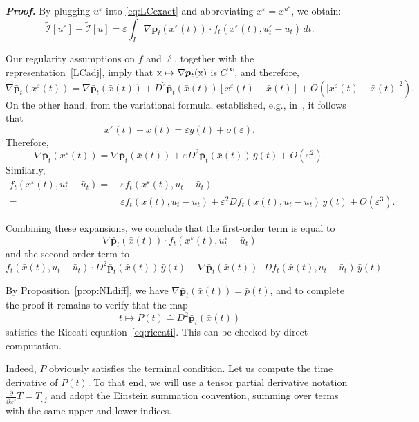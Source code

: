 \documentclass[sn-mathphys-num]{sn-jnl}
\numberwithin{equation}{section}
\theoremstyle{mythm}
\theoremstyle{mydef}
\renewenvironment{proof}{\smallskip\noindent\emph{\textbf{Proof.}}%
  \hspace{1pt}}{\hspace{-5pt}{\nobreak\quad\nobreak\hfill\nobreak%
    $\square$\vspace{2pt}\par}\smallskip\goodbreak}
\renewcommand{\epsilon}{\varepsilon}
\renewcommand{\d}{\,d}
\begin{document}
\begin{proof}
  By plugging \( u^{\varepsilon} \) into \eqref{eq:LCexact} and abbreviating \( x^{\varepsilon} = x^{u^{\varepsilon}} \), we obtain:
  \[
   \widetilde{\mathcal I}[u^{\varepsilon}] - \widetilde{\mathcal I}[\bar{u}]
   = \epsilon\int_I \nabla \bar{\bm p}_t(x^{\varepsilon}(t))\cdot f_t\left(x^{\varepsilon}(t), u^{\varepsilon}_t - \bar{u}_t\right) \d t.
 \]

Our regularity assumptions on \( f \) and \( \ell \), together with the representation~\eqref{LCadj}, imply that \( \mathrm x \mapsto \nabla \bm p_t(\rm x) \) is $C^\infty$, and therefore,
  \[
    \nabla \bar{\bm p}_t(x^{\varepsilon}(t)) = \nabla \bar{\bm p}_t(\bar{x}(t)) + D^2 \bar{\bm p}_t(\bar{x}(t)) \left[x^{\varepsilon}(t) - \bar{x}(t)\right] + O \left( \left|x^{\varepsilon}(t) - \bar{x}(t) \right|^2 \right).
  \]
  On the other hand, from the variational formula, established, e.g., in~\cite[Section~2.7]{agrachevControlTheoryGeometric2004}, it follows that \[
  x^{\varepsilon}(t) - \bar{x}(t) = \varepsilon \bar{y}(t) + o(\varepsilon).
  \]
  Therefore,
  \[
    \nabla \bar{\bm p}_t(x^{\varepsilon}(t)) = \nabla\bar{\bm p}_t(\bar{x}(t)) + \varepsilon D^2 \bar{\bm p}_t(\bar{x}(t)) \, \bar{y}(t) + O(\varepsilon^2).
  \]
  Similarly, 
  \begin{align*}
    f_t(x^{\varepsilon}(t), u^{\varepsilon}_t - \bar{u}_t) = & \
    \varepsilon f_t(x^{\varepsilon}(t), u_t - \bar{u}_t)\\ = & \ 
    \varepsilon f_t(\bar{x}(t), u_t - \bar{u}_t) + \varepsilon^2 Df_t(\bar{x}(t), u_t - \bar{u}_t) \, \bar{y}(t) + O(\varepsilon^3).
  \end{align*}

Combining these expansions, we conclude that the first-order term is equal to
  \[
    \nabla \bar{\bm p}_t(\bar{x}(t)) \cdot f_t(x^{\varepsilon}(t), u^{\varepsilon}_t - \bar{u}_t)
  \]
  and the second-order term to
  \[
    f_t(\bar{x}(t), u_t - \bar{u}_t) \cdot D^2 \bar{\bm p}_t(\bar{x}(t)) \, \bar{y}(t) + \nabla \bar{\bm p}_t(\bar{x}(t)) \cdot Df_t(\bar{x}(t), u_t - \bar{u}_t) \, \bar{y}(t).
  \]

  By Proposition~\ref{prop:NLdiff}, we have \( \nabla \bar{\bm p}_t(\bar{x}(t)) = \bar{p}(t) \), and to complete the proof it remains to verify that the map
  \[
    t \mapsto P(t) \doteq D^2 \bar{\bm p}_t(\bar{x}(t))
  \]
  satisfies the Riccati equation~\eqref{eq:riccati}. This can be checked by direct computation.

Indeed, \( P \) obviously satisfies the terminal condition. Let us compute the time derivative of \( P(t) \).
To that end, we will use a tensor partial derivative notation \( \frac{\partial}{\partial x^{j}} T = T_{,j} \) and adopt the Einstein summation convention, summing over terms with the same upper and lower indices.


\end{proof}
\end{document}
